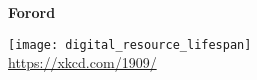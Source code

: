 \cleardoublepage
\begin{titlepage}
	\centering
	\vspace{3cm}
	{\Huge\sffamily\bfseries Forord \par} \vspace{0.5cm}
	{\texttt{[image: digital\_resource\_lifespan]}\\
		\tiny \url{https://xkcd.com/1909/} \par} \vspace{0.5cm}	
\end{titlepage}

